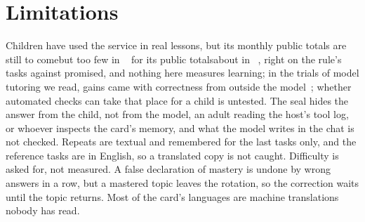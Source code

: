\section{Limitations}
\label{sec:limitations}

Children have used the service in real lessons, \ifcase{} but its monthly public totals are still to come\or but too few in ~ for its public totals\or about  in ~, \pct{} right on the rule's tasks against \pct{} promised\fi, and nothing here measures learning; in the trials of model tutoring we read, gains came with correctness from outside the model~\cite{kestin2025ai}; whether automated checks can take that place for a child is untested. The seal hides the answer from the child, not from the model, an adult reading the host's tool log, or whoever inspects the card's memory, and what the model writes in the chat is not checked. Repeats are textual and remembered for the last  tasks only, and the reference tasks are in English, so a translated copy is not caught. Difficulty is asked for, not measured. A false declaration of mastery is undone by  wrong answers in a row, but a mastered topic leaves the rotation, so the correction waits until the topic returns. Most of the card's  languages are machine translations nobody has read.
